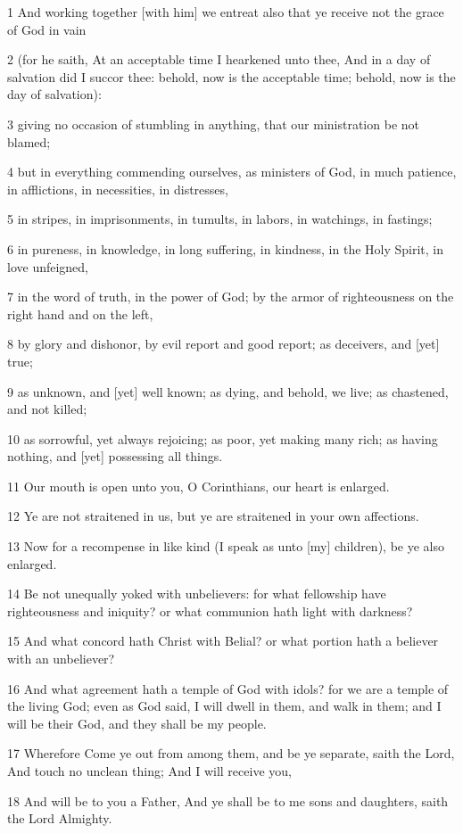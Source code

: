\par 1 And working together [with him] we entreat also that ye receive not the grace of God in vain
\par 2 (for he saith, At an acceptable time I hearkened unto thee, And in a day of salvation did I succor thee: behold, now is the acceptable time; behold, now is the day of salvation):
\par 3 giving no occasion of stumbling in anything, that our ministration be not blamed;
\par 4 but in everything commending ourselves, as ministers of God, in much patience, in afflictions, in necessities, in distresses,
\par 5 in stripes, in imprisonments, in tumults, in labors, in watchings, in fastings;
\par 6 in pureness, in knowledge, in long suffering, in kindness, in the Holy Spirit, in love unfeigned,
\par 7 in the word of truth, in the power of God; by the armor of righteousness on the right hand and on the left,
\par 8 by glory and dishonor, by evil report and good report; as deceivers, and [yet] true;
\par 9 as unknown, and [yet] well known; as dying, and behold, we live; as chastened, and not killed;
\par 10 as sorrowful, yet always rejoicing; as poor, yet making many rich; as having nothing, and [yet] possessing all things.
\par 11 Our mouth is open unto you, O Corinthians, our heart is enlarged.
\par 12 Ye are not straitened in us, but ye are straitened in your own affections.
\par 13 Now for a recompense in like kind (I speak as unto [my] children), be ye also enlarged.
\par 14 Be not unequally yoked with unbelievers: for what fellowship have righteousness and iniquity? or what communion hath light with darkness?
\par 15 And what concord hath Christ with Belial? or what portion hath a believer with an unbeliever?
\par 16 And what agreement hath a temple of God with idols? for we are a temple of the living God; even as God said, I will dwell in them, and walk in them; and I will be their God, and they shall be my people.
\par 17 Wherefore Come ye out from among them, and be ye separate, saith the Lord, And touch no unclean thing; And I will receive you,
\par 18 And will be to you a Father, And ye shall be to me sons and daughters, saith the Lord Almighty.

